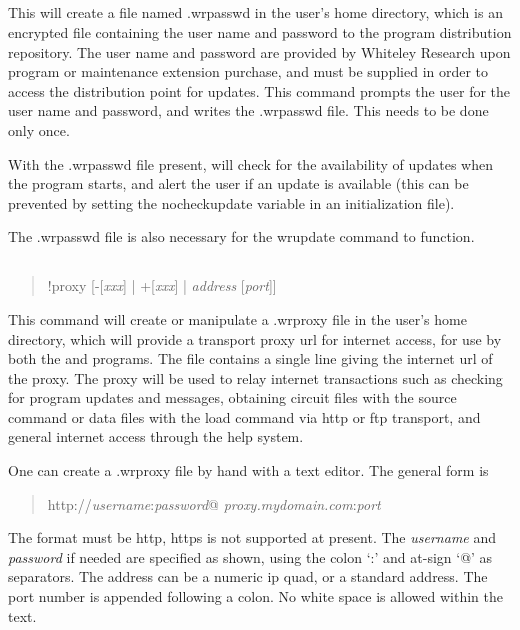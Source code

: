 \subsection{}


This will create a file named {\vt .wrpasswd} in the user's home
directory, which is an encrypted file containing the user name and
password to the program distribution repository.  The user name and
password are provided by Whiteley Research upon program or maintenance
extension purchase, and must be supplied in order to access the
distribution point for updates.  This command prompts the user for the
user name and password, and writes the {\vt .wrpasswd} file.  This
needs to be done only once.

With the {\vt .wrpasswd} file present, {\WRspice} will check for the
availability of updates when the program starts, and alert the user if
an update is available (this can be prevented by setting the {\et
nocheckupdate} variable in an initialization file).

The {\vt .wrpasswd} file is also necessary for the {\cb wrupdate}
command to function.

\subsection{}


\begin{quote}
{\vt !proxy} [{\vt -}[{\it xxx\/}] {\vt |} {\vt +}[{\it xxx\/}] {\vt |}
 {\it address} [{\it port}]]
\end{quote}

This command will create or manipulate a {\vt .wrproxy} file in the
user's home directory, which will provide a transport proxy url for
internet access, for use by both the {\Xic} and {\WRspice} programs. 
The file contains a single line giving the internet url of the proxy. 
The proxy will be used to relay internet transactions such as checking
for program updates and messages, obtaining circuit files with the
{\cb source} command or data files with the {\cb load} command via
http or ftp transport, and general internet access through the help
system.

One can create a {\vt .wrproxy} file by hand with a text editor.  The
general form is
\begin{quote}
{\vt http://}{\it username\/}{\vt :}{\it password\/}{\vt @}{\it
 proxy.mydomain.com\/}{\vt :}{\it port}
\end{quote}
The format must be {\vt http}, {\vt https} is not supported at
present.  The {\it username} and {\it password} if needed are
specified as shown, using the colon `{\vt :}' and at-sign `{\vt @}' as
separators.  The address can be a numeric ip quad, or a standard
address.  The port number is appended following a colon.  No white
space is allowed within the text.

